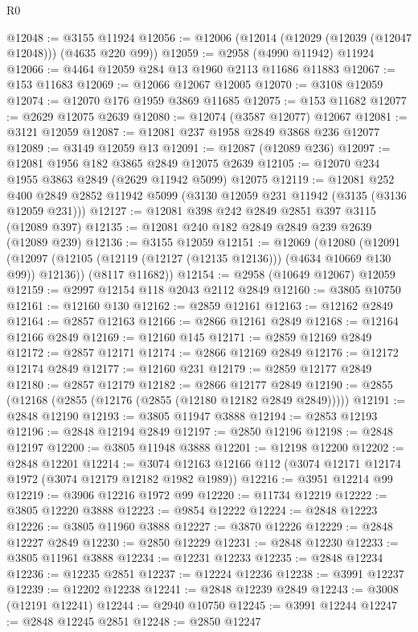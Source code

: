 \begin{lexlean}{R0}
\begin{coremodule}
@12048 := @3155 @11924
@12056 := @12006 (@12014 (@12029 (@12039 (@12047 @12048))) (@4635 @220 @99))
@12059 := @2958 (@4990 @11942) @11924
@12066 := @4464 @12059 @284 @13 @1960 @2113 @11686 @11883
@12067 := @153 @11683
@12069 := @12066 @12067 @12005
@12070 := @3108 @12059
@12074 := @12070 @176 @1959 @3869 @11685
@12075 := @153 @11682
@12077 := @2629 @12075 @2639
@12080 := @12074 (@3587 @12077) @12067
@12081 := @3121 @12059
@12087 := @12081 @237 @1958 @2849 @3868 @236 @12077
@12089 := @3149 @12059 @13
@12091 := @12087 (@12089 @236)
@12097 := @12081 @1956 @182 @3865 @2849 @12075 @2639
@12105 := @12070 @234 @1955 @3863 @2849 (@2629 @11942 @5099) @12075
@12119 := @12081
    @252
    @400
    @2849
    @2852
    @11942
    @5099
    (@3130 @12059 @231 @11942 (@3135 (@3136 @12059 @231)))
@12127 := @12081 @398 @242 @2849 @2851 @397 @3115 (@12089 @397)
@12135 := @12081 @240 @182 @2849 @2849 @239 @2639 (@12089 @239)
@12136 := @3155 @12059
@12151 := @12069
    (@12080
      (@12091 (@12097 (@12105 (@12119 (@12127 (@12135 @12136))) (@4634 @10669 @130 @99)) @12136))
      (@8117 @11682))
@12154 := @2958 (@10649 @12067) @12059
@12159 := @2997 @12154 @118 @2043 @2112 @2849
@12160 := @3805 @10750
@12161 := @12160 @130
@12162 := @2859 @12161
@12163 := @12162 @2849
@12164 := @2857 @12163
@12166 := @2866 @12161 @2849
@12168 := @12164 @12166 @2849
@12169 := @12160 @145
@12171 := @2859 @12169 @2849
@12172 := @2857 @12171
@12174 := @2866 @12169 @2849
@12176 := @12172 @12174 @2849
@12177 := @12160 @231
@12179 := @2859 @12177 @2849
@12180 := @2857 @12179
@12182 := @2866 @12177 @2849
@12190 := @2855 (@12168 (@2855 (@12176 (@2855 (@12180 @12182 @2849 @2849)))))
@12191 := @2848 @12190
@12193 := @3805 @11947 @3888
@12194 := @2853 @12193
@12196 := @2848 @12194 @2849
@12197 := @2850 @12196
@12198 := @2848 @12197
@12200 := @3805 @11948 @3888
@12201 := @12198 @12200
@12202 := @2848 @12201
@12214 := @3074 @12163 @12166 @112 (@3074 @12171 @12174 @1972 (@3074 @12179 @12182 @1982 @1989))
@12216 := @3951 @12214 @99
@12219 := @3906 @12216 @1972 @99
@12220 := @11734 @12219
@12222 := @3805 @12220 @3888
@12223 := @9854 @12222
@12224 := @2848 @12223
@12226 := @3805 @11960 @3888
@12227 := @3870 @12226
@12229 := @2848 @12227 @2849
@12230 := @2850 @12229
@12231 := @2848 @12230
@12233 := @3805 @11961 @3888
@12234 := @12231 @12233
@12235 := @2848 @12234
@12236 := @12235 @2851
@12237 := @12224 @12236
@12238 := @3991 @12237
@12239 := @12202 @12238
@12241 := @2848 @12239 @2849
@12243 := @3008 (@12191 @12241)
@12244 := @2940 @10750
@12245 := @3991 @12244
@12247 := @2848 @12245 @2851
@12248 := @2850 @12247

\end{coremodule}
\end{lexlean}
